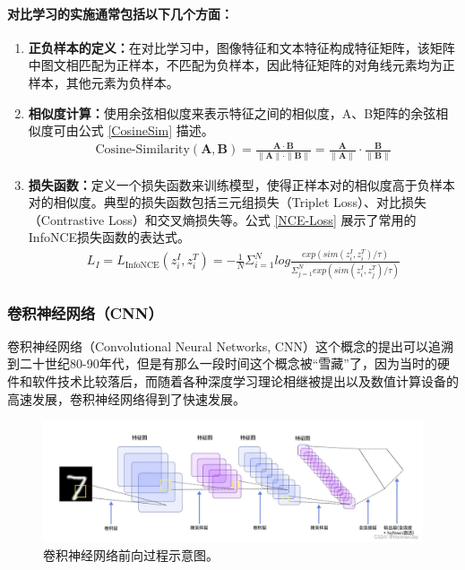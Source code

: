 \documentclass[a4paper]{zreport}
\begin{document}
\paragraph{对比学习的实施通常包括以下几个方面：}
\begin{enumerate}
\item \textbf{正负样本的定义：}在对比学习中，图像特征和文本特征构成特征矩阵，该矩阵中图文相匹配为正样本，不匹配为负样本，因此特征矩阵的对角线元素均为正样本，其他元素为负样本。
\item \textbf{相似度计算：}使用余弦相似度来表示特征之间的相似度，A、B矩阵的余弦相似度可由公式 \eqref{CosineSim} 描述。
\begin{gather}
\text{Cosine-Similarity}(\mathbf{A}, \mathbf{B})
= {\frac{\mathbf{A} \cdot \mathbf{B}} {\| \mathbf{A} \| \cdot \| \mathbf{B} \|}}
= \frac{\mathbf{A}}{\| \mathbf{A} \|} \cdot \frac{\mathbf{B}}{\| \mathbf{B} \|}
\label{CosineSim}
\end{gather}
\item \textbf{损失函数：}定义一个损失函数来训练模型，使得正样本对的相似度高于负样本对的相似度。典型的损失函数包括三元组损失（Triplet Loss）、对比损失（Contrastive Loss）和交叉熵损失等。公式 \eqref{NCE-Loss} 展示了常用的InfoNCE损失函数的表达式。
\begin{gather}
L_{I}=L_\mathrm{InfoNCE}(z_{i}^{I},z_{i}^{T})=-\frac{1}{N}\Sigma_{i=1}^{N}log\frac{exp(sim(z_{i}^{I},z_{i}^{T})/\tau)}{\Sigma_{j=1}^{N}exp(sim(z_{i}^{I},z_{j}^{T})/\tau)}\label{NCE-Loss}
\end{gather}
\end{enumerate}

\subsubsection{卷积神经网络（CNN）}

卷积神经网络（Convolutional Neural Networks, CNN）这个概念的提出可以追溯到二十世纪80-90年代，但是有那么一段时间这个概念被“雪藏”了，因为当时的硬件和软件技术比较落后，而随着各种深度学习理论相继被提出以及数值计算设备的高速发展，卷积神经网络得到了快速发展。

\begin{figure}[h]
\centering
\includegraphics[width=\linewidth]{figures/CNN1}
\caption{卷积神经网络前向过程示意图。}
\label{fig:cnn1}
\end{figure}
\end{document}
